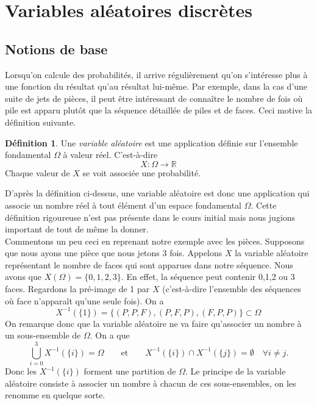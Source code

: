 \documentclass[a4paper,12pt]{report}
\theoremstyle{definition}
\newcommand{\ra}{\rightarrow}
\newcommand{\R}{\mathbb{R}}
\renewcommand{\(}{\left(}
\renewcommand{\)}{\right)}
\renewcommand{\d}{\textit}
\newtheorem{defn}[thm]{Définition}
\begin{document}
    \section{Variables aléatoires discrètes}
    
        \subsection{Notions de base}

    Lorsqu'on calcule des probabilités, il arrive régulièrement qu'on s'intéresse plus à une fonction du résultat qu'au résultat lui-même. Par exemple, dans la cas d'une suite de jets de pièces, il peut être intéressant de connaître le nombre de fois où pile est apparu plutôt que la séquence détaillée de piles et de faces. Ceci motive la définition suivante.
    
    \begin{leftbar}
        \begin{defn}
            Une \d{variable aléatoire} est une application définie sur l'ensemble fondamental $\Omega$ à valeur réel. C'est-à-dire
            $$X: \Omega \ra \R$$
            Chaque valeur de $X$ se voit associée une probabilité.
        \end{defn}
    \end{leftbar}
    
    D'après la définition ci-dessus, une variable aléatoire est donc une application qui associe un nombre réel à tout élément d'un espace fondamental $\Omega$. Cette définition rigoureuse n'est pas présente dans le cours initial mais nous jugions important de tout de même la donner.\\
        
    Commentons un peu ceci en reprenant notre exemple avec les pièces. Supposons que nous ayons une pièce que nous jetons 3 fois. Appelons $X$ la variable aléatoire représentant le nombre de faces qui sont apparues dans notre séquence. Nous avons que $X(\Omega) = \{0,1,2,3\}$. En effet, la séquence peut contenir 0,1,2 ou 3 faces. Regardons la pré-image de 1 par $X$ (c'est-à-dire l'ensemble des séquences où face n'apparaît qu'une seule fois). On a 
    $$X^{-1}(\{1\}) = \{(P,P,F), (P,F,P), (F,P,P)\} \subset \Omega$$
    On remarque donc que la variable aléatoire ne va faire qu'associer un nombre à un sous-ensemble de $\Omega$. On a que
    $$\bigcup_{i= 0}^3 X^{-1}(\{i \}) = \Omega \qquad \text{et}\qquad X^{-1}(\{i\}) \cap X^{-1}(\{j\}) = \emptyset \quad \forall i \neq j.$$
    Donc les $X^{-1}(\{i \})$ forment une partition de $\Omega$. Le principe de la variable aléatoire consiste à associer un nombre à chacun de ces sous-ensembles, on les renomme en quelque sorte.
    
\end{document}
